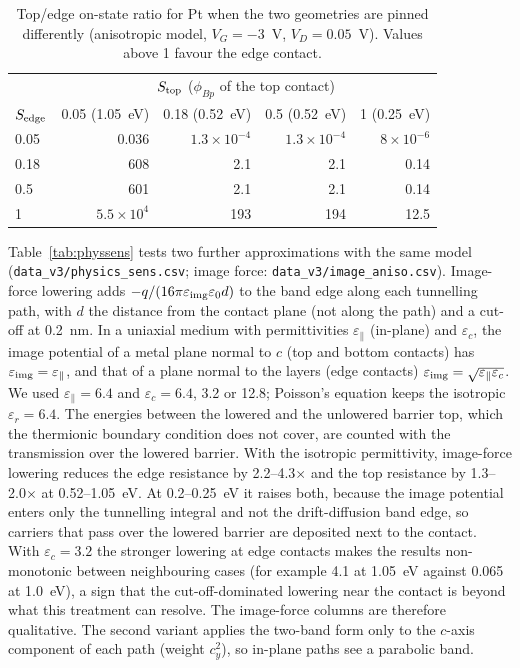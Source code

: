 \documentclass[11pt]{article}
\begin{document}
\begin{table}[!htbp]
\centering
\caption{Top/edge on-state ratio for Pt when the two geometries are pinned differently (anisotropic model, $V_G=-3$~V, $V_D=0.05$~V). Values above 1 favour the edge contact.}
\label{tab:seppin}\small
\begin{tabular}{lrrrr}
\toprule
 & \multicolumn{4}{c}{$S_{\rm top}$ ($\phi_{Bp}$ of the top contact)} \\
$S_{\rm edge}$ & 0.05 (1.05~eV) & 0.18 (0.52~eV) & 0.5 (0.52~eV) & 1 (0.25~eV) \\
\midrule
0.05 & 0.036 & $1.3\times10^{-4}$ & $1.3\times10^{-4}$ & $8\times10^{-6}$ \\
0.18 & 608 & 2.1 & 2.1 & 0.14 \\
0.5 & 601 & 2.1 & 2.1 & 0.14 \\
1 & $5.5\times10^4$ & 193 & 194 & 12.5 \\
\bottomrule
\end{tabular}
\end{table}

Table~\ref{tab:physsens} tests two further approximations with the same model (\texttt{data\_v3/physics\_sens.csv}; image force: \texttt{data\_v3/image\_aniso.csv}). Image-force lowering adds $-q/(16\pi\varepsilon_{\rm img}\varepsilon_0 d)$ to the band edge along each tunnelling path, with $d$ the distance from the contact plane (not along the path) and a cut-off at 0.2~nm. In a uniaxial medium with permittivities $\varepsilon_\parallel$ (in-plane) and $\varepsilon_c$, the image potential of a metal plane normal to $c$ (top and bottom contacts) has $\varepsilon_{\rm img}=\varepsilon_\parallel$, and that of a plane normal to the layers (edge contacts) $\varepsilon_{\rm img}=\sqrt{\varepsilon_\parallel\varepsilon_c}$. We used $\varepsilon_\parallel=6.4$ and $\varepsilon_c=6.4$, 3.2 or 12.8; Poisson's equation keeps the isotropic $\varepsilon_r=6.4$. The energies between the lowered and the unlowered barrier top, which the thermionic boundary condition does not cover, are counted with the transmission over the lowered barrier. With the isotropic permittivity, image-force lowering reduces the edge resistance by 2.2--4.3$\times$ and the top resistance by 1.3--2.0$\times$ at 0.52--1.05~eV. At 0.2--0.25~eV it raises both, because the image potential enters only the tunnelling integral and not the drift-diffusion band edge, so carriers that pass over the lowered barrier are deposited next to the contact. With $\varepsilon_c=3.2$ the stronger lowering at edge contacts makes the results non-monotonic between neighbouring cases (for example 4.1 at 1.05~eV against 0.065 at 1.0~eV), a sign that the cut-off-dominated lowering near the contact is beyond what this treatment can resolve. The image-force columns are therefore qualitative. The second variant applies the two-band form only to the $c$-axis component of each path (weight $c_y^2$), so in-plane paths see a parabolic band.
\end{document}
